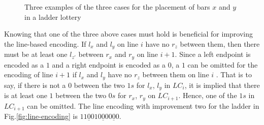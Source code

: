 \begin{figure}[!htp]
\begin{minipage}{.3\textwidth}
            \end{minipage}
        

    \caption{Three examples of the three cases for the placement 
    of bars $x$ and $y$ in a ladder lottery}
    \label{fig:three-cases}
\end{figure}

Knowing that one of the three above cases must hold is beneficial for improving the 
line-based encoding. If $l_{x}$ and $l_{y}$ on line $i$ have no $r_{z}$ between them, 
then there must be at least one $l_{z\prime}$ between $r_{x}$ and $r_{y}$ on line $i+1$.
Since a left endpoint is encoded as a $1$ and a right endpoint is encoded as a $0$, 
a $1$ can be omitted for the encoding of line $i+1$ if $l_{x}$ and $l_{y}$ have no $r_{z}$
between them on line $i$ \cite{A5}. That is to say, if there is not a $0$ between 
the two  $1s$ for $l_{x}$, $l_{y}$ in $LC_{i}$, it is implied that there is at least one $1$ between 
the two $0s$ for $r_{x}$, $r_{y}$ on $LC_{i+1}$. Hence, one of the $1s$ in $LC_{i+1}$ can be omitted. 
The line encoding with improvement two for the ladder in Fig.\ref{fig:line-encoding} is $11\underline{0}010\underline{0}00\underline{0}0$.
